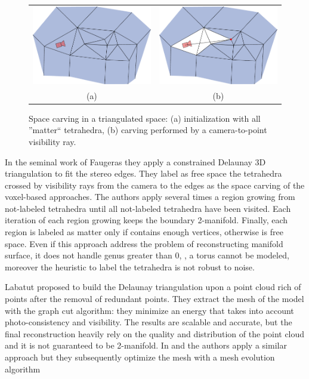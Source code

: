 \begin{figure}[t]
 \begin{tabular}{cc}
  \includegraphics[width=0.48\columnwidth]{./img/ch_soa/spaceCarving01}&
  \includegraphics[width=0.48\columnwidth]{./img/ch_soa/spaceCarving02}\\
  (a) & (b)\\
 \end{tabular}
 \caption{Space carving in a triangulated space: (a) initialization with all ''matter`` tetrahedra, (b) carving performed by a camera-to-point visibility ray.}
 \label{fig:spacecarving}
\end{figure}


In the seminal work of Faugeras \etal \cite{faugeras_et_al_90} they apply a constrained Delaunay 3D triangulation to fit the stereo edges. They label  as free space the tetrahedra crossed by visibility rays from the camera to the edges as the space carving of the voxel-based approaches. The authors apply several times a region growing from not-labeled tetrahedra  until all not-labeled tetrahedra have been visited. Each iteration of each region growing keeps the boundary 2-manifold. Finally, each region is labeled as matter only if contains enough vertices, otherwise is free space. 
Even if this approach address the problem of reconstructing manifold surface, it does not handle genus greater than 0, \eg, a torus cannot be modeled, moreover the heuristic to label the tetrahedra is not robust to noise.


Labatut \etal \cite{labatut2007efficient} proposed to build the Delaunay triangulation upon a point cloud rich of points after the removal of redundant points. 
They extract the mesh of the model with the graph cut algorithm: they minimize an energy that takes into account photo-consistency and visibility. The results are scalable and accurate, but the final reconstruction heavily rely on the quality and distribution of the point cloud and it is not guaranteed to be 2-manifold.
In \cite{hiep2009towards} and \cite{vu_et_al_2012} the authors apply a similar approach but they subsequently optimize the mesh with a mesh evolution algorithm

